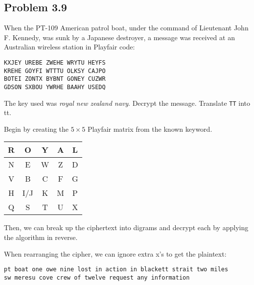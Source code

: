 \documentclass[../hw_sols.tex]{subfiles}
\begin{document}
\newpage



\subsection*{Problem 3.9}

When the PT-109 American patrol boat, under the command of Lieutenant John F. 
Kennedy, was sunk by a Japanese destroyer, a message was received at an 
Australian wireless station in Playfair code:
\begin{Verbatim}[xleftmargin=3cm]
KXJEY UREBE ZWEHE WRYTU HEYFS
KREHE GOYFI WTTTU OLKSY CAJPO
BOTEI ZONTX BYBNT GONEY CUZWR
GDSON SXBOU YWRHE BAAHY USEDQ
\end{Verbatim}

The key used was \textit{royal new zealand navy}. Decrypt the 
message. Translate \verb|TT| into tt.

\begin{solution}

Begin by creating the $5 \times 5$ Playfair matrix from the known keyword.
\begin{center}
\begin{tabular}{ | c | c | c | c | c | }
	\hline \rowcolor{cyan!20}
	R & O & Y & A & L \\
	\hline \rowcolor{cyan!20}
	N & E & W & Z & D \\
	\hline
	\cellcolor{cyan!20} V & B & C & F & G \\
	\hline
	H & I/J & K & M & P \\
	\hline
	Q &   S & T & U & X \\
	\hline
\end{tabular}
\end{center}

Then, we can break up the ciphertext into digrams and decrypt each 
by applying the algorithm in reverse.

When rearranging the cipher, we can ignore extra x's to get the 
plaintext:
\begin{Verbatim}
pt boat one owe nine lost in action in blackett strait two miles
sw meresu cove crew of twelve request any information
\end{Verbatim}

\end{solution}
\end{document}
